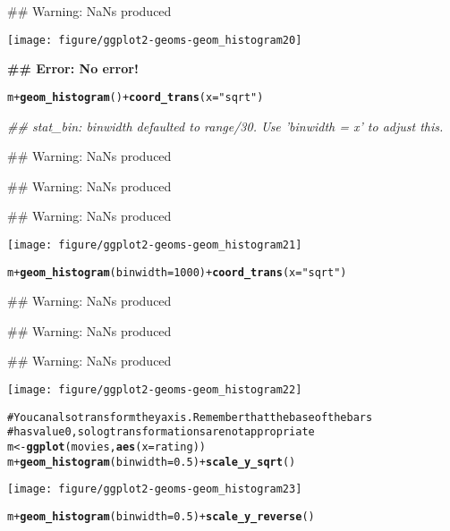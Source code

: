 \documentclass[a4paper,titlepage]{tufte-handout}\usepackage{graphicx, color}
\makeatletter
\def\maxwidth{ %
  \ifdim\Gin@nat@width>\linewidth
    \linewidth
  \else
    \Gin@nat@width
  \fi
}
\newcommand{\hlfunctioncall}[1]{\textcolor[rgb]{0.501960784313725,0,0.329411764705882}{\textbf{#1}}}%
\newcommand{\hlstring}[1]{\textcolor[rgb]{0.6,0.6,1}{#1}}%
\newcommand{\hlcomment}[1]{\textcolor[rgb]{0.180392156862745,0.6,0.341176470588235}{#1}}%
\newenvironment{kframe}{%
 \def\at@end@of@kframe{}%
 \ifinner\ifhmode%
  \def\at@end@of@kframe{\end{minipage}}%
  \begin{minipage}{\columnwidth}%
 \fi\fi%
 \def\FrameCommand##1{\hskip\@totalleftmargin \hskip-\fboxsep
 \colorbox{shadecolor}{##1}\hskip-\fboxsep
     \hskip-\linewidth \hskip-\@totalleftmargin \hskip\columnwidth}%
 \MakeFramed {\advance\hsize-\width
   \@totalleftmargin\z@ \linewidth\hsize
   \@setminipage}}%
 {\par\unskip\endMakeFramed%
 \at@end@of@kframe}
\newenvironment{knitrout}{}{} %
\makeatother
\begin{document}
\begin{knitrout}
\begin{kframe}
{\ttfamily\noindent\textcolor{warningcolor}{\#\# Warning: NaNs produced}}\end{kframe}\texttt{[image: figure/ggplot2-geoms-geom\_histogram20]} \begin{kframe}

{\ttfamily\noindent\bfseries\textcolor{errorcolor}{\#\# Error: No error!}}\begin{alltt}
m + \hlfunctioncall{geom_histogram}() + \hlfunctioncall{coord_trans}(x = \hlstring{"sqrt"})
\end{alltt}


{\ttfamily\noindent\itshape\textcolor{messagecolor}{\#\# stat\_bin: binwidth defaulted to range/30. Use 'binwidth = x' to adjust this.}}

{\ttfamily\noindent\textcolor{warningcolor}{\#\# Warning: NaNs produced}}

{\ttfamily\noindent\textcolor{warningcolor}{\#\# Warning: NaNs produced}}

{\ttfamily\noindent\textcolor{warningcolor}{\#\# Warning: NaNs produced}}\end{kframe}\texttt{[image: figure/ggplot2-geoms-geom\_histogram21]} \begin{kframe}\begin{alltt}
m + \hlfunctioncall{geom_histogram}(binwidth=1000) + \hlfunctioncall{coord_trans}(x = \hlstring{"sqrt"})
\end{alltt}


{\ttfamily\noindent\textcolor{warningcolor}{\#\# Warning: NaNs produced}}

{\ttfamily\noindent\textcolor{warningcolor}{\#\# Warning: NaNs produced}}

{\ttfamily\noindent\textcolor{warningcolor}{\#\# Warning: NaNs produced}}\end{kframe}\texttt{[image: figure/ggplot2-geoms-geom\_histogram22]} \begin{kframe}\begin{alltt}
\hlcomment{# You can also transform the y axis.  Remember that the base of the bars}
\hlcomment{# has value 0, so log transformations are not appropriate}
m <- \hlfunctioncall{ggplot}(movies, \hlfunctioncall{aes}(x = rating))
m + \hlfunctioncall{geom_histogram}(binwidth = 0.5) + \hlfunctioncall{scale_y_sqrt}()
\end{alltt}
\end{kframe}\texttt{[image: figure/ggplot2-geoms-geom\_histogram23]} \begin{kframe}\begin{alltt}
m + \hlfunctioncall{geom_histogram}(binwidth = 0.5) + \hlfunctioncall{scale_y_reverse}()
\end{alltt}



\end{kframe}
\end{knitrout}
\end{document}
